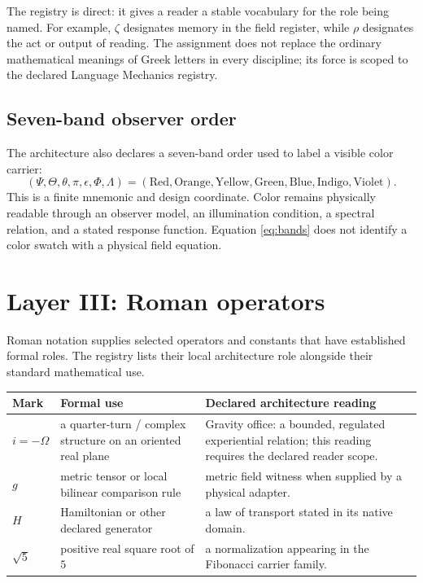 \documentclass[11pt]{article}
\begin{document}
The registry is direct: it gives a reader a stable vocabulary for the role being named. For example, $\zeta$ designates memory in the field register, while $\rho$ designates the act or output of reading. The assignment does not replace the ordinary mathematical meanings of Greek letters in every discipline; its force is scoped to the declared Language Mechanics registry.

\subsection{Seven-band observer order}
The architecture also declares a seven-band order used to label a visible color carrier:
\begin{equation}
(\Psi,\Theta,\theta,\pi,\epsilon,\Phi,\Lambda)
=(\mathrm{Red},\mathrm{Orange},\mathrm{Yellow},\mathrm{Green},\mathrm{Blue},\mathrm{Indigo},\mathrm{Violet}).
\label{eq:bands}
\end{equation}
This is a finite mnemonic and design coordinate. Color remains physically readable through an observer model, an illumination condition, a spectral relation, and a stated response function. Equation \eqref{eq:bands} does not identify a color swatch with a physical field equation.

\section{Layer III: Roman operators}
Roman notation supplies selected operators and constants that have established formal roles. The registry lists their local architecture role alongside their standard mathematical use.

\begin{center}
\begin{tabularx}{\textwidth}{@{}>{\bfseries}p{}Y Y@{}}
\toprule
\textbf{Mark} & \textbf{Formal use} & \textbf{Declared architecture reading}\\
\midrule
$i=-\Omega$ & a quarter-turn / complex structure on an oriented real plane & Gravity office: a bounded, regulated experiential relation; this reading requires the declared reader scope.\\
$g$ & metric tensor or local bilinear comparison rule & metric field witness when supplied by a physical adapter.\\
$H$ & Hamiltonian or other declared generator & a law of transport stated in its native domain.\\
$\sqrt{5}$ & positive real square root of $5$ & a normalization appearing in the Fibonacci carrier family.\\
\bottomrule
\end{tabularx}
\end{center}
\end{document}
